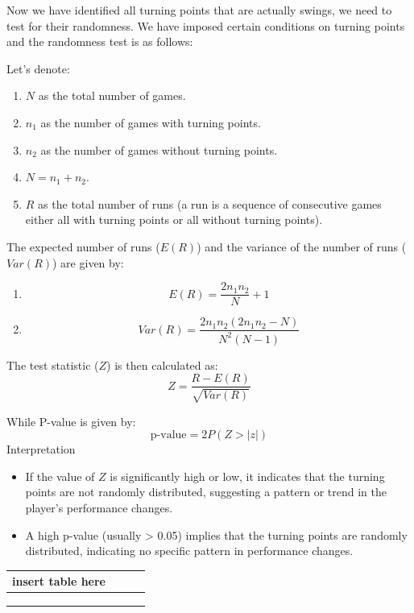 \documentclass[11pt,a4paper]{article}
\begin{document}
	Now we have identified all turning points that are actually swings, we need to test for their randomness. We have imposed certain conditions on turning points and the randomness test is as follows:
		
	Let's denote:
	\begin{enumerate}
		\item \( N \) as the total number of games.
		\item \( n_1 \) as the number of games with turning points.
		\item \( n_2 \) as the number of games without turning points.
		\item \( N = n_1 + n_2 \).
		\item \( R \) as the total number of runs (a run is a sequence of consecutive games either all with turning points or all without turning points).
	\end{enumerate}
		
	The expected number of runs (\( E(R) \)) and the variance of the number of runs (\( Var(R) \)) are given by:
	\begin{enumerate}
		\item \[ E(R) = \frac{2n_1n_2}{N} + 1 \]
		\item \[ Var(R) = \frac{2n_1n_2(2n_1n_2 - N)}{N^2(N - 1)} \]
	\end{enumerate}
	
	The test statistic (\( Z \)) is then calculated as:
	\[ Z = \frac{R - E(R)}{\sqrt{Var(R)}} \]
	
	While P-value is given by:
	\[ \text{p-value} = 2P(Z > |z|) \]
	Interpretation	
	\begin{itemize}
		\item If the value of \( Z \) is significantly high or low, it indicates that the turning points are not randomly distributed, suggesting a pattern or trend in the player's performance changes.
		\item A high p-value (usually > 0.05) implies that the turning points are randomly distributed, indicating no specific pattern in performance changes.	
	\end{itemize}
	
	\begin{tabular}{|c|c|c|c|}
		\hline
		insert table here&  &  &  \\
		\hline
		&  &  &  \\
		\hline
		&  &  &  \\
		\hline
		&  &  &  \\
		\hline
	\end{tabular}
\end{document}
